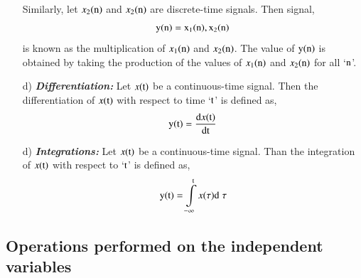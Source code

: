 \begin{itemize}
Similarly, let $x_{2}(\textrm{n})$ and $x_{2}(\textrm{n})$ are discrete-time signals. Then signal,
\begin{equation}
\textrm{y}(\rm  n) = x_{1}(\textrm{n}), x_{2}(\textrm{n})\label{chap1-eq-1.31}
\end{equation}
is known as the multiplication of $x_{1}(\textrm{n})$ and $x_{2}(\textrm{n})$. The value of $\textrm{y}(\textrm{n})$ is obtained by taking the production of the values of $x_{1}(\textrm{n})$ and $x_{2}(\textrm{n})$ for all `$\textrm{n}$'.

\item[{\rm d)}]{\it \bfseries Differentiation:} Let $x(\textrm{t})$ be a continuous-time signal. Then the differentiation of $x(\textrm{t})$  with respect to time `$\textrm{t}$' is defined as,
\begin{equation}
\textrm{y}(\textrm{t}) = \dfrac{{\textrm{d}} x{(\textrm{t})}}{\textrm{d} \textrm{t}}\label{chap1-eq-1.32}
\end{equation}

\item[{\rm d)}]{\it \bfseries Integrations:} Let $x(\textrm{t})$ be a continuous-time signal. Than the integration of $x(\textrm{t})$ with respect to `$\textrm{t}$' is defined as,
\begin{equation}
\textrm{y}(\textrm{t})= \int\limits_{-\infty}^{\textrm{t}}x(\tau)\textrm{d} \; \tau\label{chap1-eq-1.33}
\end{equation}
\end{itemize}

\subsection{Operations performed on the independent variables}\label{chap1-subsec-1.5.2}


